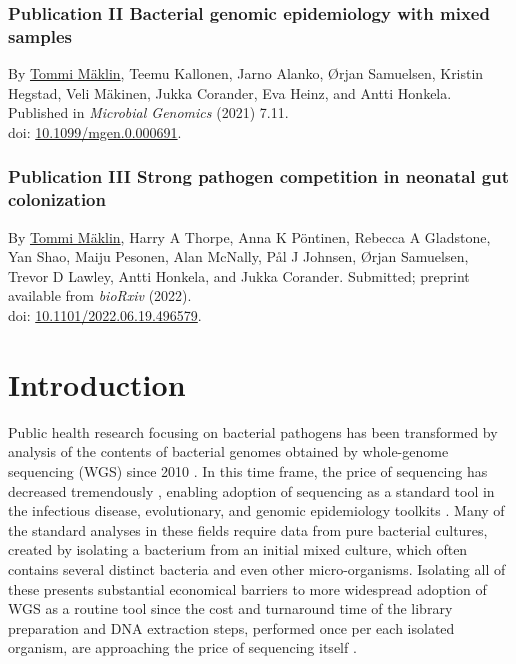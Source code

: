 \documentclass[officiallayout]{tktla}
\begin{document}
\subsection*{Publication II \textemdash{ } Bacterial genomic epidemiology with mixed samples}
By \underline{Tommi M\"aklin}, Teemu Kallonen, Jarno Alanko, \O rjan
Samuelsen, Kristin Hegstad, Veli M\"akinen, Jukka Corander, Eva Heinz,
and Antti Honkela. Published in \textit{Microbial Genomics} (2021)
7.11. \\doi:
\href{https://doi.org/10.1099/mgen.0.000691}{10.1099/mgen.0.000691}.

\subsection*{Publication III \textemdash{ } Strong pathogen competition in neonatal gut colonization}
By \underline{Tommi M\"aklin}, Harry A Thorpe, Anna K P\"ontinen,
Rebecca A Gladstone, Yan Shao, Maiju Pesonen, Alan McNally, P\aa l J
Johnsen, \O rjan Samuelsen, Trevor D Lawley, Antti Honkela, and Jukka
Corander. Submitted; preprint available from \textit{bioRxiv}
(2022). \\doi:
\href{https://doi.org/10.1101/2022.06.19.496579}{10.1101/2022.06.19.496579}.

\chapter{Introduction}
\sloppy

Public health research focusing on bacterial pathogens has been
transformed by analysis of the contents of bacterial genomes obtained
by whole-genome sequencing (WGS) since 2010
\citep{armstrong2019pathogen}. In this time frame, the price of
sequencing has decreased tremendously \citep{dnaseqcost,
  goodwin2016coming}, enabling adoption of sequencing as a standard
tool in the infectious disease, evolutionary, and genomic epidemiology
toolkits \citep{tang2017infection, grad2014epidemiologic,
  kwong2015whole}. Many of the standard analyses in these fields
require data from pure bacterial cultures, created by isolating a
bacterium from an initial mixed culture, which often contains several
distinct bacteria and even other micro-organisms. Isolating all of
these presents substantial economical barriers to more widespread
adoption of WGS as a routine tool since the cost and turnaround time
of the library preparation and DNA extraction steps, performed once
per each isolated organism, are approaching the price of sequencing
itself \citep{rossen2018practical}.
\end{document}
